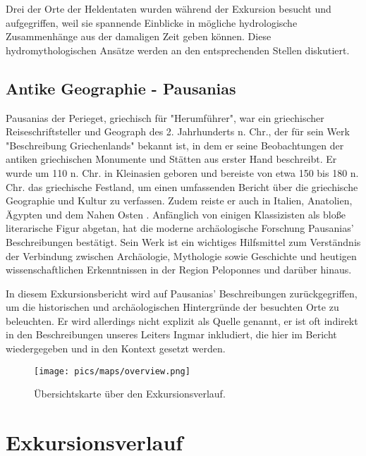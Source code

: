 \documentclass[preprint]{geomorphica} %
\begin{document}
Drei der Orte der Heldentaten wurden während der Exkursion besucht und aufgegriffen, weil sie spannende Einblicke in mögliche hydrologische Zusammenhänge aus der damaligen Zeit geben können. Diese hydromythologischen Ansätze werden an den entsprechenden Stellen diskutiert.

\subsection*{Antike Geographie - Pausanias}

Pausanias der Perieget, griechisch für "Herumführer", war ein griechischer Reiseschriftsteller und Geograph des 2. Jahrhunderts n. Chr., der für sein Werk "Beschreibung Griechenlands" bekannt ist, in dem er seine Beobachtungen der antiken griechischen Monumente und Stätten aus erster Hand beschreibt. Er wurde um 110 n. Chr. in Kleinasien geboren und bereiste von etwa 150 bis 180 n. Chr. das griechische Festland, um einen umfassenden Bericht über die griechische Geographie und Kultur zu verfassen. Zudem reiste er auch in Italien, Anatolien, Ägypten und dem Nahen Osten \cite{habichtPausaniasUndSeine1985}. Anfänglich von einigen Klassizisten als bloße literarische Figur abgetan, hat die moderne archäologische Forschung Pausanias' Beschreibungen bestätigt. Sein Werk ist ein wichtiges Hilfsmittel zum Verständnis der Verbindung zwischen Archäologie, Mythologie sowie Geschichte und heutigen wissenschaftlichen Erkenntnissen in der Region Peloponnes und darüber hinaus.

In diesem Exkursionsbericht wird auf Pausanias' Beschreibungen zurückgegriffen, um die historischen und archäologischen Hintergründe der besuchten Orte zu beleuchten. Er wird allerdings nicht explizit als Quelle genannt, er ist oft indirekt in den Beschreibungen unseres Leiters Ingmar inkludiert, die hier im Bericht wiedergegeben und in den Kontext gesetzt werden.


\newpage

\begin{figure}[!h]
    \centering
    \texttt{[image: pics/maps/overview.png]}
    \caption{Übersichtskarte über den Exkursionsverlauf.}
    \label{pic:overview}
\end{figure}

\section*{Exkursionsverlauf}
\end{document}
